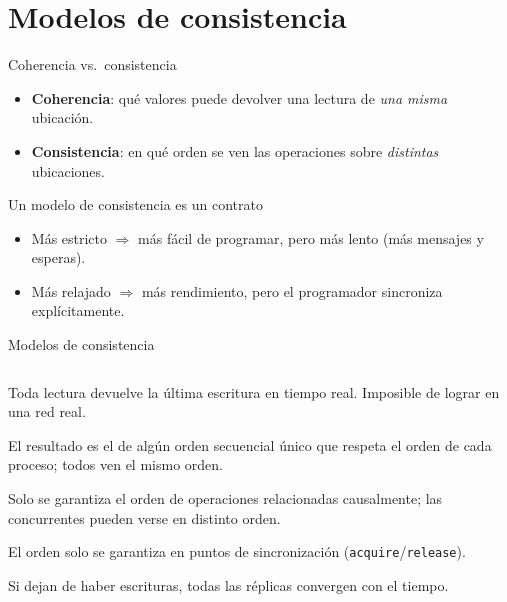 \documentclass[aspectratio=169,11pt]{beamer}
\newcommand{\exponente}{}
\newcommand{\seccion}[2]{\renewcommand{\exponente}{#2}\section{#1}}
\begin{document}
\seccion{Modelos de consistencia}{Marcelino}

\begin{frame}{Coherencia vs.\ consistencia}
  \begin{itemize}
    \item \textbf{Coherencia}: qué valores puede devolver una lectura de \emph{una misma} ubicación.
    \item \textbf{Consistencia}: en qué orden se ven las operaciones sobre \emph{distintas} ubicaciones.
  \end{itemize}
  \begin{alertblock}{\faHandshake\enspace Un modelo de consistencia es un contrato}
    \begin{itemize}
      \item Más estricto $\Rightarrow$ más fácil de programar, pero más lento (más mensajes y esperas).
      \item Más relajado $\Rightarrow$ más rendimiento, pero el programador sincroniza explícitamente.
    \end{itemize}
  \end{alertblock}
\end{frame}

\begin{frame}{Modelos de consistencia}
  \begin{columns}[c]
    \small
    \begin{description}\setlength{\itemsep}{.35em}
      \item[Estricta] Toda lectura devuelve la última escritura en tiempo real. Imposible de lograr en una red real.
      \item[Secuencial (Lamport)] El resultado es el de algún orden secuencial único que respeta el orden de cada proceso; todos ven el mismo orden.
      \item[Causal] Solo se garantiza el orden de operaciones relacionadas causalmente; las concurrentes pueden verse en distinto orden.
      \item[Débil / de liberación] El orden solo se garantiza en puntos de sincronización (\texttt{acquire}/\texttt{release}).
      \item[Eventual] Si dejan de haber escrituras, todas las réplicas convergen con el tiempo.
    \end{description}
  \end{columns}
\end{frame}
\end{document}
